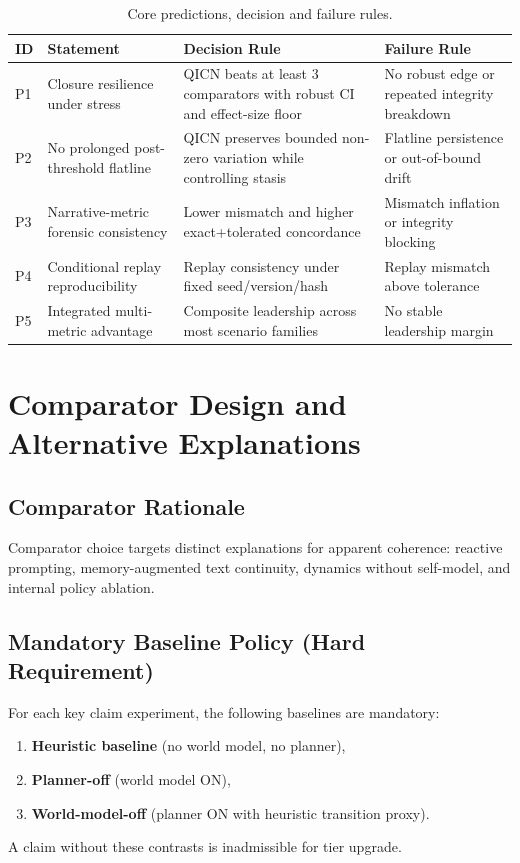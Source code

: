 \documentclass[11pt,a4paper]{article}
\theoremstyle{definition}
\begin{document}
\begin{table}[htbp]
\centering
\begin{tabular}{|p{0.6cm}|p{3.1cm}|p{4.8cm}|p{4.6cm}|}
\hline
\textbf{ID} & \textbf{Statement} & \textbf{Decision Rule} & \textbf{Failure Rule} \\
\hline
P1 & Closure resilience under stress & QICN beats at least 3 comparators with robust CI and effect-size floor & No robust edge or repeated integrity breakdown \\
\hline
P2 & No prolonged post-threshold flatline & QICN preserves bounded non-zero variation while controlling stasis & Flatline persistence or out-of-bound drift \\
\hline
P3 & Narrative-metric forensic consistency & Lower mismatch and higher exact+tolerated concordance & Mismatch inflation or integrity blocking \\
\hline
P4 & Conditional replay reproducibility & Replay consistency under fixed seed/version/hash & Replay mismatch above tolerance \\
\hline
P5 & Integrated multi-metric advantage & Composite leadership across most scenario families & No stable leadership margin \\
\hline
\end{tabular}
\caption{Core predictions, decision and failure rules.}
\end{table}

\section{Comparator Design and Alternative Explanations}
\subsection{Comparator Rationale}
Comparator choice targets distinct explanations for apparent coherence:
reactive prompting, memory-augmented text continuity, dynamics without self-model, and internal policy ablation.

\subsection{Mandatory Baseline Policy (Hard Requirement)}
For each key claim experiment, the following baselines are mandatory:
\begin{enumerate}
\item \textbf{Heuristic baseline} (no world model, no planner),
\item \textbf{Planner-off} (world model ON),
\item \textbf{World-model-off} (planner ON with heuristic transition proxy).
\end{enumerate}
A claim without these contrasts is inadmissible for tier upgrade.
\end{document}
